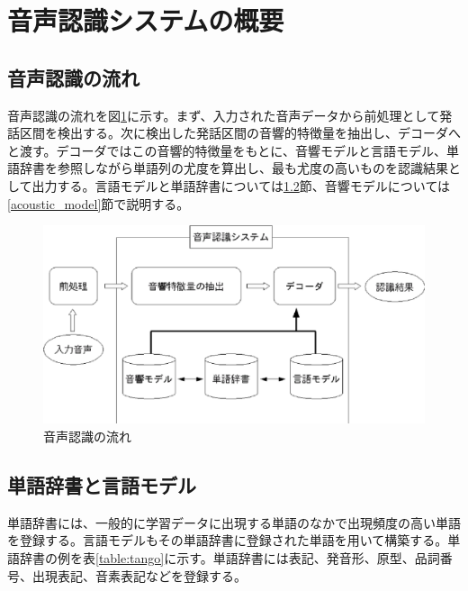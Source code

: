 \section{音声認識システムの概要}
\subsection{音声認識の流れ}
音声認識の流れを図\ref{fig:flow_sp}に示す。まず、入力された音声データから前処理として発話区間を検出する。次に検出した発話区間の音響的特徴量を抽出し、デコーダへと渡す。デコーダではこの音響的特徴量をもとに、音響モデルと言語モデル、単語辞書を参照しながら単語列の尤度を算出し、最も尤度の高いものを認識結果として出力する。言語モデルと単語辞書については\ref{language_model}節、音響モデルについては\ref{acoustic_model}節で説明する。

\begin{figure}[H]
  \begin{center}
    \includegraphics{./figure/flow_sp.eps}
  \end{center}
  \caption{音声認識の流れ}
  \label{fig:flow_sp}
\end{figure}

\subsection{単語辞書と言語モデル}
\label{language_model}

\par
単語辞書には、一般的に学習データに出現する単語のなかで出現頻度の高い単語を登録する\cite{sp_recognition_shikano}。言語モデルもその単語辞書に登録された単語を用いて構築する。単語辞書の例を表\ref{table:tango}に示す。単語辞書には表記、発音形、原型、品詞番号、出現表記、音素表記などを登録する。\par

